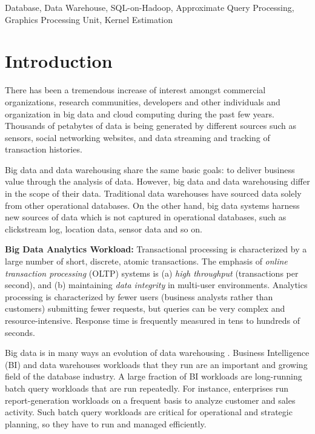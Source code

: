 \documentclass[conference]{IEEEtran}
\begin{document}
\begin{IEEEkeywords}
Database, Data Warehouse, SQL-on-Hadoop, Approximate Query Processing, Graphics Processing Unit, Kernel Estimation
\end{IEEEkeywords}

\section{Introduction}
\label{sc:Introduction}
There has been a tremendous increase of interest amongst commercial organizations, research communities, developers and other individuals and organization in big data and cloud computing during the past few years. Thousands of petabytes of data is being generated by different sources such as sensors, social networking websites, and data streaming and tracking of transaction histories. 

Big data and data warehousing share the same basic goals: to deliver business value through the analysis of data.
However, big data and data warehousing differ in the scope of their data. Traditional data warehouses have sourced data solely from other operational databases. On the other hand, big data systems harness new sources of data which is not captured in operational databases, such as clickstream log, location data, sensor data and so on.

\noindent
\textbf{Big Data Analytics Workload:}
Transactional processing is characterized by a large number of short, discrete, atomic transactions. 
The emphasis of \textit{online transaction processing} (OLTP) systems is (a) \textit{high throughput }(transactions per second), 
and (b) maintaining \textit{data integrity} in multi-user environments.
Analytics processing is characterized by fewer users (business analysts rather than customers) submitting fewer requests, 
but queries can be very complex and resource-intensive. Response time is frequently measured in tens to hundreds of seconds.

Big data is in many ways an evolution of data warehousing \cite{Zaharia:2010}.
Business Intelligence (BI) and data warehouses workloads that they run are an important and growing field of the database industry.
A large fraction of BI workloads are long-running batch query workloads that are run repeatedly.
For instance, enterprises run report-generation workloads on a frequent basis to analyze customer and sales activity.
Such batch query workloads are critical for operational and strategic planning, so they have to run and managed efficiently.
\end{document}
